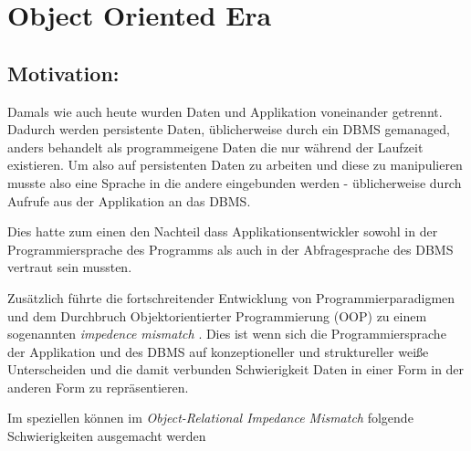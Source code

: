 

%


\section{Object Oriented Era}

\subsection{Motivation:}

Damals wie auch heute wurden Daten und Applikation voneinander getrennt. Dadurch werden persistente Daten, üblicherweise durch ein DBMS gemanaged, anders behandelt als programmeigene Daten die nur während der Laufzeit existieren. Um also auf persistenten Daten zu arbeiten und diese zu manipulieren musste also eine Sprache in die andere eingebunden werden - üblicherweise durch Aufrufe aus der Applikation an das DBMS.

Dies hatte zum einen den Nachteil dass Applikationsentwickler sowohl in der Programmiersprache des Programms als auch in der Abfragesprache des DBMS vertraut sein mussten.

Zusätzlich führte die fortschreitender Entwicklung von Programmierparadigmen und dem Durchbruch Objektorientierter Programmierung (OOP) zu einem sogenannten \emph{impedence mismatch} \cite{copeland1984}. Dies ist wenn sich die Programmiersprache der Applikation und des DBMS auf konzeptioneller und struktureller weiße Unterscheiden und die damit verbunden Schwierigkeit Daten in einer Form in der anderen Form zu repräsentieren.

Im speziellen können im \emph{Object-Relational Impedance Mismatch} folgende Schwierigkeiten ausgemacht werden \cite{ireland2009}


